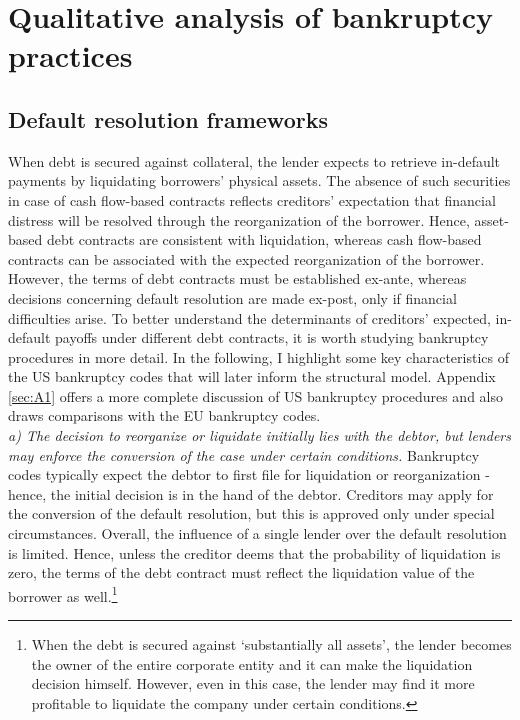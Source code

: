 \documentclass[12pt]{article}
\begin{document}
\section{Qualitative analysis of bankruptcy practices \label{sec: qualitative analysis}}
\subsection{Default resolution frameworks \label{sec: default resolutions}}
When debt is secured against collateral, the lender expects to retrieve in-default payments by liquidating borrowers’ physical assets. The absence of such securities in case of cash flow-based contracts reflects creditors’ expectation that financial distress will be resolved through the reorganization of the borrower. Hence, asset-based debt contracts are consistent with liquidation, whereas cash flow-based contracts can be associated with the expected reorganization of the borrower.  \vspace{3mm} \\
However, the terms of debt contracts must be established ex-ante, whereas decisions concerning default resolution are made ex-post, only if financial difficulties arise. To better understand the determinants of creditors' expected, in-default payoffs under different debt contracts, it is worth studying bankruptcy procedures in more detail. In the following, I highlight some key characteristics of the US bankruptcy codes that will later inform the structural model. Appendix \ref{sec:A1} offers a more complete discussion of US bankruptcy procedures and also draws comparisons with the EU bankruptcy codes. \vspace{3mm} \\
\textit{a) The decision to reorganize or liquidate initially lies with the debtor, but lenders may enforce the conversion of the case under certain conditions.} Bankruptcy codes typically expect the debtor to first file for liquidation or reorganization - hence, the initial decision is in the hand of the debtor. Creditors may apply for the conversion of the default resolution, but this is approved only under special circumstances. Overall, the influence of a single lender over the default resolution is limited. Hence, unless the creditor deems that the probability of liquidation is zero, the terms of the debt contract must reflect the liquidation value of the borrower as well.\footnote{When the debt is secured against `substantially all assets', the lender becomes the owner of the entire corporate entity and it can make the liquidation decision himself. However, even in this case, the lender may find it more profitable to liquidate the company under certain conditions.}  \vspace{3mm} \\
\end{document}
